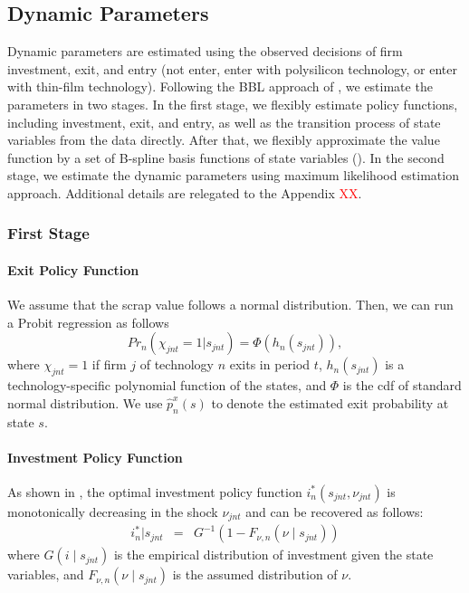 \documentclass[12pt]{article}
\begin{document}
\subsection{Dynamic Parameters}
\label{subsec:est_dynamic}
Dynamic parameters are estimated using the observed decisions of firm investment, exit, and entry (not enter, enter with polysilicon technology, or enter with thin-film technology). Following the BBL approach of \citet{bajari2007estimating}, we estimate the parameters in two stages. In the first stage, we flexibly estimate policy functions, including investment, exit, and entry, as well as the transition process of state variables from the data directly. After that, we flexibly approximate the value function by a set of B-spline basis functions of state variables (\citet{sweeting2013dynamic}). In the second stage, we estimate the dynamic parameters using maximum likelihood estimation approach. Additional details are relegated to the Appendix \textcolor{red}{XX}.


\subsubsection{First Stage}
\paragraph{Exit Policy Function} 
We assume that the scrap value follows a normal distribution. Then, we can run a Probit regression as follows
\begin{equation}
    Pr_n(\chi_{jnt}=1|s_{jnt})=\Phi(h_n(s_{jnt})),
\end{equation}
where $\chi_{jnt}=1$ if firm $j$ of technology $n$ exits in period $t$, $h_n(s_{jnt})$ is a technology-specific polynomial function of the states, and $\Phi$ is the cdf of standard normal distribution. We use $\hat{p}^x_n(s)$ to denote the estimated exit probability at state $s$.



\paragraph{Investment Policy Function}
As shown in \citet{bajari2007estimating}, the optimal investment policy function $i_n^*(s_{jnt},\nu_{jnt})$ is monotonically decreasing in the shock $\nu_{jnt}$ and can be recovered as follows:
\begin{eqnarray}
i_n^*|s_{jnt} &=& G^{-1}(1-F_{\nu,n}(\nu\mid s_{jnt})) \label{eq:est_investment}
\end{eqnarray}
where $G(i\mid s_{jnt})$ is the empirical distribution of investment given the state variables, and $F_{\nu,n}(\nu\mid s_{jnt})$ is the assumed distribution of $\nu$.
\end{document}
